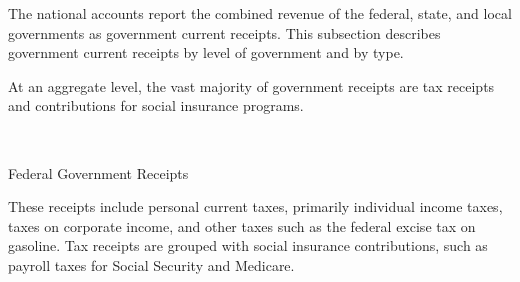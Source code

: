 \begin{minipage}{0.76\textwidth}
\small The national accounts report the combined revenue of the federal, state, and local governments as government current receipts. This subsection describes government current receipts by level of government and by type. 

At an aggregate level, the vast majority of government receipts are tax receipts and contributions for social insurance programs. 
\vspace{0.5mm}

\\
\vspace{4.5mm}

\normalsize Federal Government Receipts
\vspace{-1mm}

\small  These receipts include personal current taxes, primarily individual income taxes, taxes on corporate income, and other taxes such as the federal excise tax on gasoline. Tax receipts are grouped with social insurance contributions, such as payroll taxes for Social Security and Medicare. 
\end{minipage}
\vspace{0.5mm}

